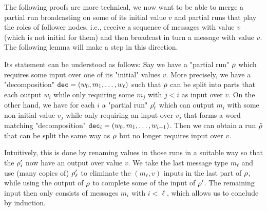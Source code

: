 The following proofs are more technical, we now want to be able to merge a partial run broadcasting on some of its initial value $v$ and partial runs that play the roles of follower nodes, i.e., receive a sequence of messages with value $v$ (which is not initial for them) and then broadcast in turn a message with value $v$. The following lemma will make a step in this direction.

Its statement can be understood as follows: Say we have a "partial run" $\rho$ which requires some input over one of its "initial" values $v$. More precisely, we have a "decomposition" $\mathtt{dec} = (w_0, m_1, \ldots, w_\ell)$ such that $\rho$ can be split into parts that each output $w_i$ while only requiring some $m_j$ with $j<i$ as input over $v$. On the other hand, we have for each $i$ a "partial run" $\rho'_i$ which can output $m_i$ with some non-initial value $v_j$ while only requiring an input over $v_j$ that forms a word matching "decomposition" $\mathtt{dec}_i = (w_0, m_1, \ldots, w_{i-1})$. 
Then we can obtain  a run $\Tilde{\rho}$ that can be split the same way as $\rho$ but no longer requires input over $v$.

Intuitively, this is done by renaming values in those runs in a suitable way so that the $\rho'_i$ now have an output over value $v$. We take the last message type $m_\ell$ and use (many copies of) $\rho'_\ell$ to eliminate the $(m_\ell, v)$ inputs in the last part of $\rho$, while using the output of $\rho$ to complete some of the input of $\rho'$. The remaining input then only consists of messages $m_{i}$ with $i<\ell$, which allows us to conclude by induction.


